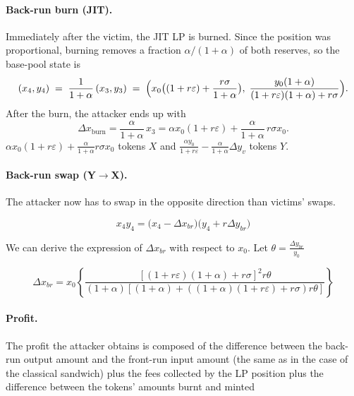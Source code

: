 \documentclass[a4paper,11pt]{article}
\begin{document}
\paragraph{Back-run burn (JIT).}
Immediately after the victim, the JIT LP is burned. Since the position was proportional, burning removes a fraction $\alpha/(1+\alpha)$ of both reserves, so the base-pool state is
\begin{equation}
  (x_4,y_4) \;=\; \frac{1}{1+\alpha}\,(x_3,y_3)
 \;=\; \Bigl(x_0\bigl((1+r\varepsilon)+\frac{r\sigma}{1+\alpha}\bigr),\;
             \frac{y_0(1+\alpha)}{(1+r\varepsilon)(1+\alpha)+r\sigma}\Bigr).
  \label{eq:mix_state_after_burn}
\end{equation}
After the burn, the attacker ends up with 
\begin{equation}
    \Delta x_{\mathrm{burn}}
    = \frac{\alpha}{1+\alpha}\,x_3
    = \alpha x_0(1+r\varepsilon) + \frac{\alpha}{1+\alpha}\,r\sigma x_0.
\end{equation}
$\alpha x_0(1+r\varepsilon) + \frac{\alpha}{1+\alpha}r \sigma x_0$ tokens $X$ and $\frac{\alpha y_0}{1+r\varepsilon} - \frac{\alpha}{1+\alpha}\Delta y_v$ tokens $Y$.

\paragraph{Back-run swap (Y$\to$X).}
The attacker now has to swap in the opposite direction than victims' swaps. 

\begin{equation}
    x_4 y_4 = \bigl( x_4 - \Delta x_{br}\bigr)\bigl(y_4 + r\Delta y_{br}\bigr)
\end{equation}

We can derive the expression of $\Delta x_{br}$ with respect to $x_0$. Let $\theta = \frac{\Delta y_{br}}{y_0}$

\begin{equation}
\Delta x_{br} = x_0 \left\{\frac{\left[(1+r\varepsilon)(1+\alpha) + r\sigma\right]^2r\theta}{(1+\alpha)\left[(1+\alpha) + \left((1+\alpha)(1+r\varepsilon)+r\sigma\right)r\theta\right]} \right\}
\end{equation}

\paragraph{Profit.} The profit the attacker obtains is composed of the difference between the back-run output amount and the front-run input amount (the same as in the case of the classical sandwich) plus the fees collected by the LP position plus the difference between the tokens' amounts burnt and minted
\end{document}
